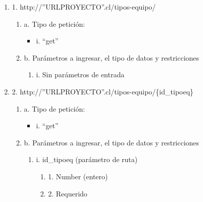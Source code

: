 \begin{enumerate}
    \item 1. http://”URLPROYECTO”.cl/tipos-equipo/
    \begin{enumerate}
        \item a. Tipo de petición:
            \begin{itemize}
               \item i. “get”
            \end{itemize}
        \item b. Parámetros a ingresar, el tipo de datos y restricciones
            \begin{enumerate}
                \item i. Sin parámetros de entrada
            \end{enumerate}
    \end{enumerate}

    \item 2. http://”URLPROYECTO”.cl/tipos-equipo/\{id\_tipoeq\}
    \begin{enumerate}
        \item a. Tipo de petición:
            \begin{itemize}
               \item i. “get”
            \end{itemize}
        \item b. Parámetros a ingresar, el tipo de datos y restricciones
            \begin{enumerate}
                \item i. id\_tipoeq (parámetro de ruta)
                    \begin{enumerate}
                        \item 1. Number (entero)
                        \item 2. Requerido
                    \end{enumerate}
            \end{enumerate}
    \end{enumerate}


\end{enumerate}
